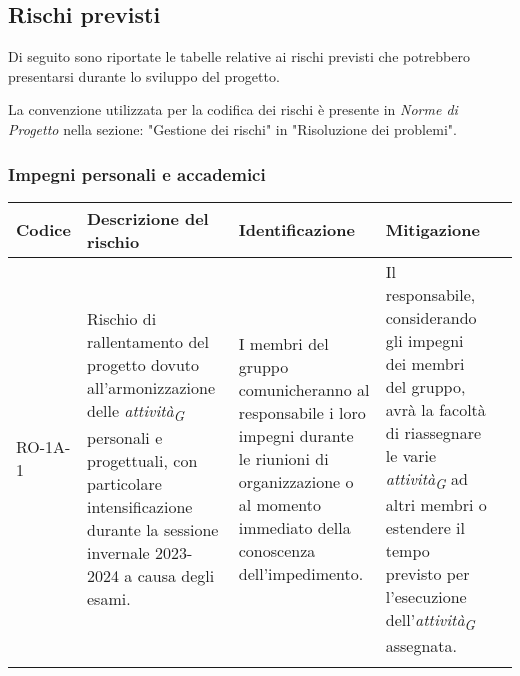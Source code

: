 \subsection{Rischi previsti}
Di seguito sono riportate le tabelle relative ai rischi previsti che potrebbero presentarsi durante lo sviluppo del progetto.  

La convenzione utilizzata per la codifica dei rischi è presente in \textit{Norme di Progetto} nella sezione: "Gestione dei rischi" in "Risoluzione dei problemi".  


\subsubsection{Impegni personali e accademici}\label{sec:ImpPersonali}
\begin{table}[H]
    \centering
    \begin{tabularx}{\textwidth}{l>{\RaggedRight}X>{\RaggedRight}X>{\RaggedRight}X>{\RaggedRight}X}
    \toprule
    \rowcolor{gray!50}
    \textbf{Codice} & \textbf{Descrizione del rischio} & \textbf{Identificazione} & \textbf{Mitigazione} \\
    \midrule
    \addlinespace 
    RO-1A-1 & 
    Rischio di rallentamento del progetto dovuto all'armonizzazione delle \textit{attività}\textsubscript{\textit{G}} personali e progettuali, con particolare intensificazione durante la sessione invernale 2023-2024 a causa degli esami. & 
    I membri del gruppo comunicheranno al responsabile i loro impegni durante le riunioni di organizzazione o al momento immediato della conoscenza dell'impedimento. & 
    Il responsabile, considerando gli impegni dei membri del gruppo, avrà la facoltà di riassegnare le varie \textit{attività}\textsubscript{\textit{G}} ad altri membri o estendere il tempo previsto per l'esecuzione dell'\textit{attività}\textsubscript{\textit{G}} assegnata.\\  
    \bottomrule
    \addlinespace 
    \end{tabularx}
\end{table}

\pagebreak

